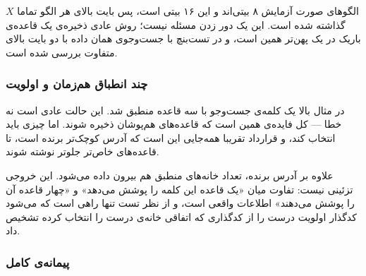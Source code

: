 \documentclass[10pt,a4paper]{article}
\begin{document}
الگوهای صورت آزمایش ۸ بیتی‌اند و این  ۱۶ بیتی است، پس بایت بالای هر الگو تماما $X$ گذاشته شده است. این یک دور زدن مسئله نیست؛ روش عادی ذخیره‌ی یک قاعده‌ی باریک در یک  پهن‌تر همین است، و در تست‌بنچ با جست‌وجوی همان داده با {دو بایت بالای متفاوت} بررسی شده است.

\subsubsection*{چند انطباق هم‌زمان و اولویت}

در مثال بالا یک کلمه‌ی جست‌وجو با سه قاعده منطبق شد. این حالت عادی است نه خطا — کل فایده‌ی  همین است که قاعده‌های هم‌پوشان ذخیره شوند. اما چیزی باید انتخاب کند، و قرارداد تقریبا همه‌جایی این است که {آدرس کوچک‌تر برنده است}، تا قاعده‌های خاص‌تر جلوتر نوشته شوند.

\begin{latin}

\end{latin}

علاوه بر آدرس برنده، {تعداد} خانه‌های منطبق هم بیرون داده می‌شود. این خروجی تزئینی نیست: تفاوت میان «یک قاعده این کلمه را پوشش می‌دهد» و «چهار قاعده آن را پوشش می‌دهند» اطلاعات واقعی است، و از نظر تست تنها راهی است که می‌شود کدگذار اولویت درست را از کدگذاری که {اتفاقی} خانه‌ی درست را انتخاب کرده تشخیص داد.

\subsubsection*{پیمانه‌ی کامل}
\end{document}
